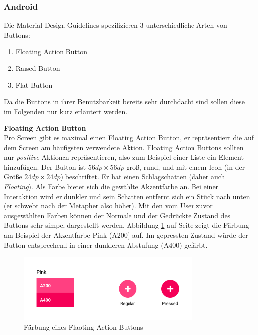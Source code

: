 \subsubsection{Android}

Die Material Design Guidelines spezifizieren 3 unterschiedliche Arten von Buttons:

\begin{enumerate}
	\item Floating Action Button
	\item Raised Button
	\item Flat Button
\end{enumerate}

Da die Buttons in ihrer Benutzbarkeit bereits sehr durchdacht sind sollen diese im Folgenden nur kurz erläutert werden.

\textbf{Floating Action Button} \\
Pro Screen gibt es maximal einen Floating Action Button, er repräsentiert die auf dem Screen am häufigsten verwendete Aktion. Floating Action Buttons sollten nur \textit{positive} Aktionen repräsentieren, also zum Beispiel einer Liste ein Element hinzufügen.
Der Button ist $56dp \times 56dp$ groß, rund, und mit einem Icon (in der Größe $24dp \times 24dp$) beschriftet. Er hat einen Schlagschatten (daher auch \textit{Floating}). Als Farbe bietet sich die gewählte Akzentfarbe an. Bei einer Interaktion wird er dunkler und sein Schatten entfernt sich ein Stück nach unten (er schwebt nach der Metapher also höher).
Mit den vom User zuvor ausgewählten Farben können der Normale und der Gedrückte Zustand des Buttons sehr simpel dargestellt werden. Abbildung \ref{fig:fab-colors} auf Seite \pageref{fig:fab-colors} zeigt die Färbung am Beispiel der Akzentfarbe Pink (A200) auf. Im gepressten Zustand würde der Button entsprechend in einer dunkleren Abstufung (A400) gefärbt.

\begin{figure}[h]
    \centering
    \includegraphics[width=0.8\textwidth]{images/FAB-colors.png}
    \caption{Färbung eines Flaoting Action Buttons}
    \label{fig:fab-colors}
\end{figure}

